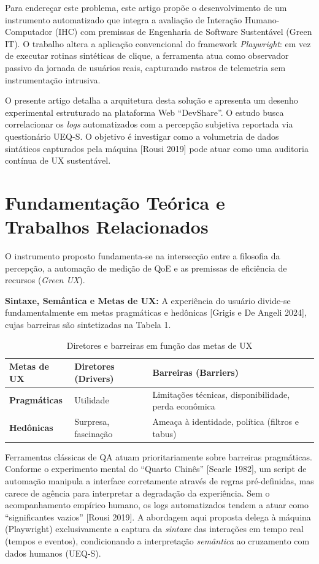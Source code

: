 \documentclass[12pt]{article}
\begin{document}
Para endereçar este problema, este artigo propõe o desenvolvimento de um instrumento automatizado que integra a avaliação de Interação Humano-Computador (IHC) com premissas de Engenharia de Software Sustentável (Green IT). O trabalho altera a aplicação convencional do framework \textit{Playwright}: em vez de executar rotinas sintéticas de clique, a ferramenta atua como observador passivo da jornada de usuários reais, capturando rastros de telemetria sem instrumentação intrusiva.

O presente artigo detalha a arquitetura desta solução e apresenta um desenho experimental estruturado na plataforma Web ``DevShare''. O estudo busca correlacionar os \textit{logs} automatizados com a percepção subjetiva reportada via questionário UEQ-S. O objetivo é investigar como a volumetria de dados sintáticos capturados pela máquina [Rousi 2019] pode atuar como uma auditoria contínua de UX sustentável.

\section{Fundamentação Teórica e Trabalhos Relacionados}

O instrumento proposto fundamenta-se na intersecção entre a filosofia da percepção, a automação de medição de QoE e as premissas de eficiência de recursos (\textit{Green UX}).

\textbf{Sintaxe, Semântica e Metas de UX:} A experiência do usuário divide-se fundamentalmente em metas pragmáticas e hedônicas [Grigis e De Angeli 2024], cujas barreiras são sintetizadas na Tabela 1.

\begin{table}[htbp]
  \centering
  \caption{Diretores e barreiras em função das metas de UX}
  \begin{tabular}{p{2.5cm} p{4cm} p{7cm}}
    \toprule
    \textbf{Metas de UX} & \textbf{Diretores (Drivers)} & \textbf{Barreiras (Barriers)} \\
    \midrule
    \textbf{Pragmáticas} & Utilidade & Limitações técnicas, disponibilidade, perda econômica \\
    \textbf{Hedônicas} & Surpresa, fascinação & Ameaça à identidade, política (filtros e tabus) \\
    \bottomrule
  \end{tabular}
\end{table}

Ferramentas clássicas de QA atuam prioritariamente sobre barreiras pragmáticas. Conforme o experimento mental do ``Quarto Chinês'' [Searle 1982], um script de automação manipula a interface corretamente através de regras pré-definidas, mas carece de agência para interpretar a degradação da experiência. Sem o acompanhamento empírico humano, os logs automatizados tendem a atuar como ``significantes vazios'' [Rousi 2019]. A abordagem aqui proposta delega à máquina (Playwright) exclusivamente a captura da \textit{sintaxe} das interações em tempo real (tempos e eventos), condicionando a interpretação \textit{semântica} ao cruzamento com dados humanos (UEQ-S).
\end{document}
